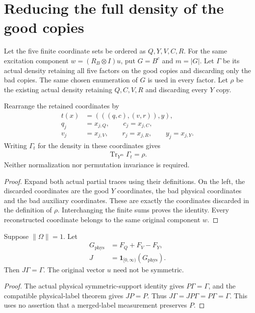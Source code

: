 \section{Reducing the full density of the good copies}
\label{sec:replica_good_configuration_reduction}

Let the five finite coordinate sets be ordered as $Q,Y,V,C,R$.
For the same excitation component $w=(R_B\otimes I)u$, put $G=B^c$
and $m=|G|$. Let $\Gamma$ be its actual density retaining all five factors
on the good copies and discarding only the bad copies. The same chosen
enumeration of $G$ is used in every factor. Let $\rho$ be the existing
actual density retaining $Q,C,V,R$ and discarding every $Y$ copy.

\begin{theorem}
\label{thm:replica_good_configuration_trace_Y}
\leanok
{}
Rearrange the retained coordinates by
\begin{align}
 t(x)&=(((q,c),(v,r)),y),\\
 q_j&=x_{j,Q},\qquad c_j=x_{j,C},\\
 v_j&=x_{j,V},\qquad r_j=x_{j,R},\qquad y_j=x_{j,Y}.
\end{align}
Writing $\Gamma_t$ for the density in these coordinates gives
\begin{align}
 \operatorname{Tr}_{Y^m}\Gamma_t=\rho.
\end{align}
Neither normalization nor permutation invariance is required.
\end{theorem}
\begin{proof}\leanok
Expand both actual partial traces using their definitions. On the left,
the discarded coordinates are the good $Y$ coordinates, the bad physical
coordinates and the bad auxiliary coordinates. These are exactly the
coordinates discarded in the definition of $\rho$. Interchanging the
finite sums proves the identity. Every reconstructed coordinate belongs
to the same original component $w$.
\end{proof}

\begin{theorem}
\label{thm:replica_good_configuration_J_support}
\leanok
{}
Suppose $\|\Omega\|=1$. Let
\begin{align}
 G_{\mathrm{phys}}&=F_Q+F_V-F_Y,\\
 J&=\mathbf1_{[0,\infty)}(G_{\mathrm{phys}}).
\end{align}
Then $J\Gamma=\Gamma$. The original vector $u$ need not be symmetric.
\end{theorem}
\begin{proof}\leanok
The actual physical symmetric-support identity gives $P\Gamma=\Gamma$,
and the compatible physical-label theorem gives $JP=P$. Thus
$J\Gamma=JP\Gamma=P\Gamma=\Gamma$.
This uses no assertion that a merged-label measurement preserves $P$.
\end{proof}

